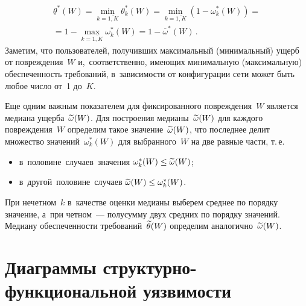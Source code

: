 \begin{multicols}{2}
\vspace*{-12pt}

\noindent
\begin{multline*}
\underline {\theta}^*(W) = \min\limits_{k = \overline{1, K}} \theta_k^*(W) = 
\min\limits_{k = \overline{1, K}}\left(1 - \omega_k^*(W)\right) ={}\\
{}= 1 - 
\max_{k = \overline{1, K}}\omega_k^*(W) = 1 - \overline {\omega}^*(W)\,.  
\end{multline*}
Заметим, что пользователей, получивших максимальный (минимальный) 
ущерб от повреждения~$W$ и,~соответственно, имеющих минимальную (максимальную) 
обеспеченность требований,  в~зависимости от конфигурации сети может 
быть любое число от~1 до~$K$.

Еще одним важным показателем для фиксированного повреждения~$W$ является 
медиана ущерба~$\widetilde{\omega}(W)$. Для построения медианы~$\widetilde{\omega}(W)$  
для каждого повреждения~$W$ определим такое значение~$\widetilde{\omega}(W)$, 
что последнее делит множество значений~$\omega_k^*(W)$ для выбранного~$W$ 
на две равные части, т.\,е. 
\begin{itemize}
\item в~половине~случаев~значения $\omega_k^*(W) \hm\le \wl{\omega}(W)$;
\item
в~другой~половине~случаев $\wl{\omega}(W) \hm\leq \omega_k^*(W)$.
\end{itemize}
При нечетном~$k$ в~качестве оценки медианы выберем  среднее по порядку значение, 
а~при четном~--- полусумму двух средних по порядку значений. Медиану обеспеченности 
требований~$\widetilde{\theta}(W)$ определим аналогично~$\widetilde{\omega}(W)$. 

\section{Диаграммы структурно-функциональной уязвимости}


\end{multicols}
